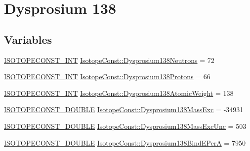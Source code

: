 \hypertarget{group___isotope_const-_dysprosium-_dy138}{}\section{Dysprosium 138}
\label{group___isotope_const-_dysprosium-_dy138}
\subsection*{Variables}
\begin{DoxyCompactItemize}
\item 
\mbox{\hyperlink{group___isotope_const-_macros_ga5f18360b3e99483a35c32d789e62621c}{I\+S\+O\+T\+O\+P\+E\+C\+O\+N\+S\+T\+\_\+\+I\+NT}} \mbox{\hyperlink{group___isotope_const-_dysprosium-_dy138_gaa6166ffa79489672ec58533996443605}{Isotope\+Const\+::\+Dysprosium138\+Neutrons}} = 72
\item 
\mbox{\hyperlink{group___isotope_const-_macros_ga5f18360b3e99483a35c32d789e62621c}{I\+S\+O\+T\+O\+P\+E\+C\+O\+N\+S\+T\+\_\+\+I\+NT}} \mbox{\hyperlink{group___isotope_const-_dysprosium-_dy138_ga8bd631edc404e007de8b736db91b54a7}{Isotope\+Const\+::\+Dysprosium138\+Protons}} = 66
\item 
\mbox{\hyperlink{group___isotope_const-_macros_ga5f18360b3e99483a35c32d789e62621c}{I\+S\+O\+T\+O\+P\+E\+C\+O\+N\+S\+T\+\_\+\+I\+NT}} \mbox{\hyperlink{group___isotope_const-_dysprosium-_dy138_gadc7f8b2c910709ed480d85914d89ad24}{Isotope\+Const\+::\+Dysprosium138\+Atomic\+Weight}} = 138
\item 
\mbox{\hyperlink{group___isotope_const-_macros_ga8f45a7272ce02c0b4c65c44636ed719a}{I\+S\+O\+T\+O\+P\+E\+C\+O\+N\+S\+T\+\_\+\+D\+O\+U\+B\+LE}} \mbox{\hyperlink{group___isotope_const-_dysprosium-_dy138_ga953be84d8e91aec5168e8d6adc4e9366}{Isotope\+Const\+::\+Dysprosium138\+Mass\+Exc}} = -\/34931
\item 
\mbox{\hyperlink{group___isotope_const-_macros_ga8f45a7272ce02c0b4c65c44636ed719a}{I\+S\+O\+T\+O\+P\+E\+C\+O\+N\+S\+T\+\_\+\+D\+O\+U\+B\+LE}} \mbox{\hyperlink{group___isotope_const-_dysprosium-_dy138_ga61c9ac43bd65ae468960302330a8570a}{Isotope\+Const\+::\+Dysprosium138\+Mass\+Exc\+Unc}} = 503
\item 
\mbox{\hyperlink{group___isotope_const-_macros_ga8f45a7272ce02c0b4c65c44636ed719a}{I\+S\+O\+T\+O\+P\+E\+C\+O\+N\+S\+T\+\_\+\+D\+O\+U\+B\+LE}} \mbox{\hyperlink{group___isotope_const-_dysprosium-_dy138_ga0737bb3daf2423e79a3f41259e7e2c5c}{Isotope\+Const\+::\+Dysprosium138\+Bind\+E\+PerA}} = 7950
\item 

\end{DoxyCompactItemize}
